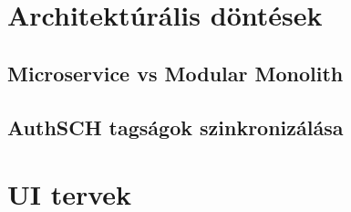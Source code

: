 \section{Architektúrális döntések}

\subsection{Microservice vs Modular Monolith}

\subsection{AuthSCH tagságok szinkronizálása}


\section{UI tervek}

